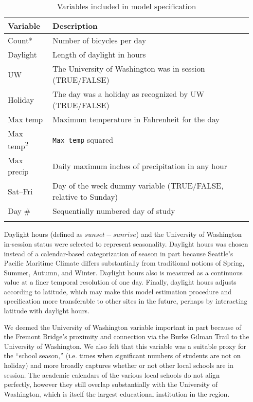 \documentclass[12pt,letterpaper,article]{memoir}
\begin{document}
\begin{table}[ht!]
\begin{center}
\begin{scriptsize}
\caption{Variables included in model specification}
\begin{tabularx}{0.7\textwidth}{>{\raggedright\arraybackslash}p{1.6cm}>{\raggedright\arraybackslash}X}
\toprule
Variable & Description \\
\midrule
Count* & Number of bicycles per day \\
Daylight  & Length of daylight in hours \\
UW & The University of Washington was in session (TRUE/FALSE) \\
Holiday & The day was a holiday as recognized by UW (TRUE/FALSE) \\
Max temp & Maximum temperature in Fahrenheit for the day \\
Max temp\textsuperscript{2} & \texttt{Max temp} squared \\
Max precip & Daily maximum inches of precipitation in any hour \\
Sat--Fri & Day of the week dummy variable (TRUE/FALSE, relative to Sunday) \\
Day \# & Sequentially numbered day of study \\
\bottomrule
\multicolumn{2}{r}{* Dependent variable}
\end{tabularx}

\label{tb:variables}
\end{scriptsize}
\end{center}
\end{table}


Daylight hours (defined as $sunset - sunrise$) and the University of
Washington in-session status were selected to represent seasonality.
Daylight hours was chosen instead of a calendar-based categorization
of season in part because Seattle's Pacific Maritime Climate differs
substantially from traditional notions of Spring, Summer, Autumn, and
Winter. Daylight hours also is measured as a continuous value at a
finer temporal resolution of one day. Finally, daylight hours adjusts
according to latitude, which may make this model estimation procedure
and specification more transferable to other sites in the future,
perhaps by interacting latitude with daylight hours.

We deemed the University of Washington variable important in part
because of the Fremont Bridge's proximity and connection via the Burke
Gilman Trail to the University of Washington. We also felt that this
variable was a suitable proxy for the ``school season,'' (i.e. times
when significant numbers of students are not on holiday) and more
broadly captures whether or not other local schools are in session.
The academic calendars of the various local schools do not align
perfectly, however they still overlap substantially with the
University of Washington, which is itself the largest educational
institution in the region.
\end{document}

